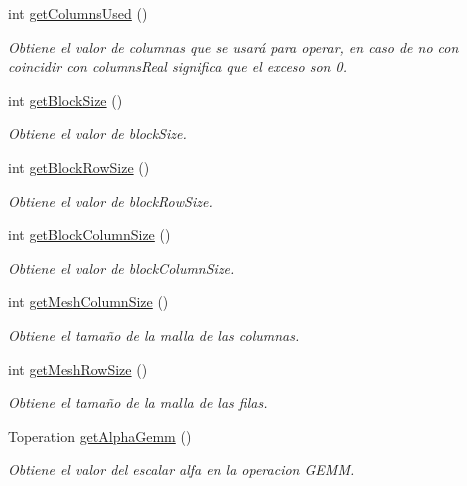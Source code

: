 \begin{DoxyCompactItemize}
int \hyperlink{classMatrixMain_a82b10c2d369328d9254fdc7a435f173f}{get\+Columns\+Used} ()
\begin{DoxyCompactList}\small\item\em Obtiene el valor de columnas que se usará para operar, en caso de no con coincidir con columns\+Real significa que el exceso son 0. \end{DoxyCompactList}\item 
int \hyperlink{classMatrixMain_aa838ad93f6915c9425de28416cfd28af}{get\+Block\+Size} ()
\begin{DoxyCompactList}\small\item\em Obtiene el valor de block\+Size. \end{DoxyCompactList}\item 
int \hyperlink{classMatrixMain_ab30c2ac0e3100c1e248fbdc1bcbb146c}{get\+Block\+Row\+Size} ()
\begin{DoxyCompactList}\small\item\em Obtiene el valor de block\+Row\+Size. \end{DoxyCompactList}\item 
int \hyperlink{classMatrixMain_ad2dafe8a675361da10486c8c7b3e16cd}{get\+Block\+Column\+Size} ()
\begin{DoxyCompactList}\small\item\em Obtiene el valor de block\+Column\+Size. \end{DoxyCompactList}\item 
int \hyperlink{classMatrixMain_a1b92a3021af1891db86cf8041cea5b84}{get\+Mesh\+Column\+Size} ()
\begin{DoxyCompactList}\small\item\em Obtiene el tamaño de la malla de las columnas. \end{DoxyCompactList}\item 
int \hyperlink{classMatrixMain_ab7d8f63bf41a6ba3d77dfddda7d891db}{get\+Mesh\+Row\+Size} ()
\begin{DoxyCompactList}\small\item\em Obtiene el tamaño de la malla de las filas. \end{DoxyCompactList}\item 
Toperation \hyperlink{classMatrixMain_a300c5ebe0494dde69fe7b8bc3a63ad0b}{get\+Alpha\+Gemm} ()
\begin{DoxyCompactList}\small\item\em Obtiene el valor del escalar alfa en la operacion G\+E\+MM. \end{DoxyCompactList}\item 

\end{DoxyCompactItemize}
